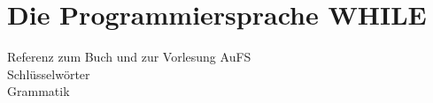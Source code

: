 \chapter{Die Programmiersprache WHILE}

Referenz zum Buch und zur Vorlesung AuFS\\

Schlüsselwörter\\
Grammatik\\